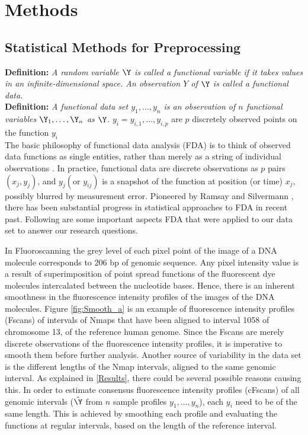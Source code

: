 \section{Methods}

\subsection{Statistical Methods for Preprocessing} \label{Sec4_Smooth}
\noindent
{\bf{Definition:}} {\emph{A random variable $\Y$ is called a functional variable if it takes values in an infinite-dimensional space. An observation $Y$ of $\Y$ is called a functional data.}} \cite{Ferraty_Vieu_2006_Nonparametric}\\
\noindent
{\bf{Definition:}} {\emph{A functional data set $y_1, \dots, y_n$ is an observation of $n$ functional variables $\Y_1, \dots, \Y_n$ as $\Y$.}} $y_i = {y_{i,1}, \dots, y_{i,p}}$ are $p$ discretely observed points on the function $y_i$\\

The basic philosophy of functional data analysis (FDA) is to think of observed data functions as single entities, rather than merely as a string of individual observations \cite{Ramsay_2006_Functional}. In practice, functional data are discrete observations as $p$ pairs $(x_j, y_j)$, and $y_j (\text{or } y_{ij})$ is a snapshot of the function at position (or time) $x_j$, possibly blurred by measurement error. Pioneered by Ramsay and Silvermann \cite{Ramsay_2006_Functional}, there has been substantial progress in statistical approaches to FDA in recent past. Following are some important aspects FDA that were applied to our data set to answer our research questions.

In Fluoroscanning the grey level of each pixel point of the image of a DNA molecule corresponds to 206 bp of genomic sequence. Any pixel intensity value is a result of superimposition of point spread functions of the fluorescent dye molecules intercalated between the nucleotide bases. Hence, there is an inherent smoothness in the fluorescence intensity profiles of the images of the DNA molecules. Figure \ref{fig:Smooth_a} is an example of fluorescence intensity profiles (Fscans) of intervals of Nmaps that have been aligned to interval 1058 of chromosome 13, of the reference human genome. Since the Fscans are merely discrete observations of the fluorescence intensity profiles, it is imperative to smooth them before further analysis. Another source of variability in the data set is the different lengths of the Nmap intervals, aligned to the same genomic interval. As explained in \ref{Results}, there could be several possible reasons causing this. In order to estimate consensus fluorescence intensity profiles (cFscans) of all genomic intervals ($\hat{\Y}$ from $n$ sample profiles $y_1, \dots, y_n$), each $y_i$ need to be of the same length. This is achieved by smoothing each profile and evaluating the functions at regular intervals, based on the length of the reference interval. 

